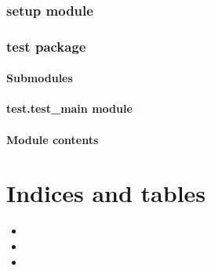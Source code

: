 \documentclass[a4paper,11pt,english]{sphinxmanual}
\begin{document}
\subsection{setup module}
\label{\detokenize{setup:setup-module}}\label{\detokenize{setup::doc}}

\subsection{test package}
\label{\detokenize{test:test-package}}\label{\detokenize{test::doc}}

\subsubsection{Submodules}
\label{\detokenize{test:submodules}}

\subsubsection{test.test\_main module}
\label{\detokenize{test:module-test.test_main}}\label{\detokenize{test:test-test-main-module}}

\begin{fulllineitems}
\label{\detokenize{test:test.test_main.test_main}}
\end{fulllineitems}



\subsubsection{Module contents}
\label{\detokenize{test:module-test}}\label{\detokenize{test:module-contents}}

\chapter{Indices and tables}
\label{\detokenize{index:indices-and-tables}}\begin{itemize}
\item {} 
\sphinxAtStartPar
{}

\item {} 
\sphinxAtStartPar
{}

\item {} 
\sphinxAtStartPar
{}

\end{itemize}
\end{document}
